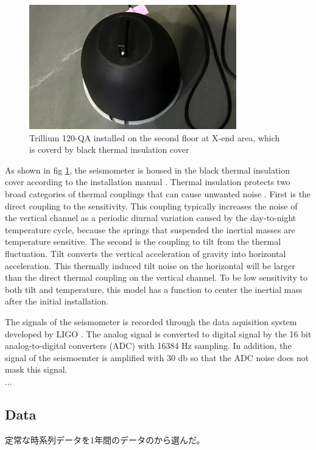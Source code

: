 \begin{figure}[H]
  \begin{center}   
    \includegraphics[width=9.0cm]{./img_chap3/img316.png}
    \caption{Trillium 120-QA installed on the second floor at X-end area, which is coverd by black thermal insulation cover}\label{img:img316}
  \end{center}
\end{figure}

As shown in fig \ref{img:img316}, the seismometer is housed in the black thermal insulation cover according to the installation manual \cite{trillium120manual}. Thermal insulation protects two broad categories of thermal couplings that can cause unwanted noise \cite{trillium120manual}. First is the direct coupling to the sensitivity. This coupling typically increases the noise of the vertical channel as a periodic diurnal variation caused by the day-to-night temperature cycle, because the springs that suspended the inertial masses are temperature sensitive. The second is the coupling to tilt from the thermal fluctuation. Tilt converts the vertical acceleration of gravity into horizontal acceleration. This thermally induced tilt noise on the horizontal will be larger than the direct thermal coupling on the vertical channel. To be low sensitivity to both tilt and temperature, this model has a function to center the inertial mass after the initial installation.

The signals of the seismometer is recorded through the data aquisition system developed by LIGO \cite{bork2001overview}. The analog signal is converted to digital signal by the 16 bit analog-to-digital converters (ADC) with 16384 $\mathrm{Hz}$ sampling. In addition, the signal of the seismoemter is amplified with 30 db so that the ADC noise does not mask this signal.\\
...

\subsection{Data}
定常な時系列データを1年間のデータのから選んだ。



